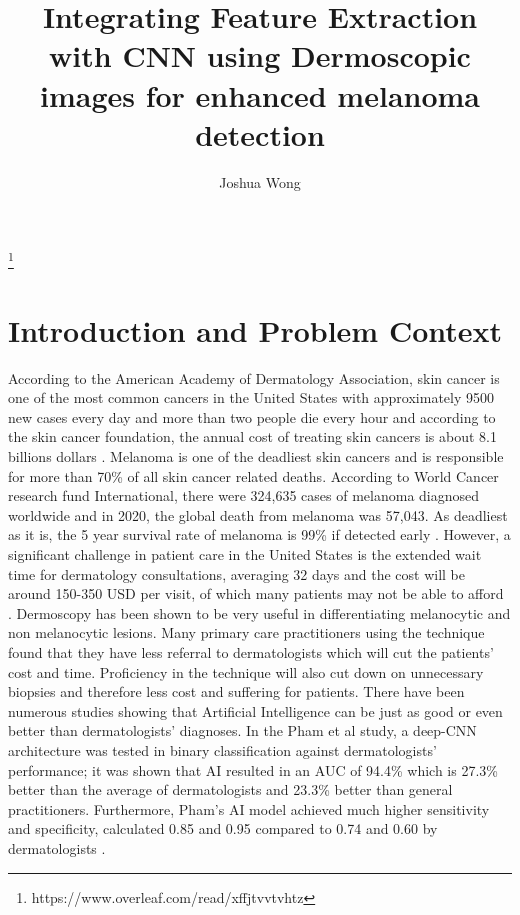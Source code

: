 \documentclass[10pt,twocolumn]{article}
\title{Integrating Feature Extraction with CNN using Dermoscopic images for enhanced melanoma detection
}
\author{Joshua Wong}
\affiliation{Occidental College}
\begin{document}
\maketitle
\footnote{https://www.overleaf.com/read/xffjtvvtvhtz}

\section{Introduction and Problem Context}

According to the American Academy of Dermatology Association, skin cancer is one of the most common cancers in the United States with approximately 9500 new cases every day and more than two people die every hour and according to the skin cancer foundation, the annual cost of treating skin cancers is about 8.1 billions dollars \cite{AmericanAcademy}.
\newline
\newline
Melanoma is one of the deadliest skin cancers and is responsible for more than 70\% of all skin cancer related deaths. According to World Cancer research fund International, there were 324,635 cases of melanoma diagnosed worldwide and in 2020, the global death from melanoma was 57,043. As deadliest as it is, the 5 year survival rate of melanoma is 99\% if detected early \cite{MelanomaIntro}. However, a significant challenge in patient care in the United States is the extended wait time for dermatology consultations, averaging 32 days \cite{Alexander} and the cost will be around 150-350 USD per visit, of which many patients may not be able to afford \cite{MiiSkin_2023}.
\newline
\newline
Dermoscopy has been shown to be very useful in differentiating melanocytic and non melanocytic lesions. Many primary care practitioners using the technique found that they have less referral to dermatologists which will cut the patients’ cost and time. Proficiency in the technique will also cut down on unnecessary biopsies and therefore less cost and suffering for patients. 
\newline
\newline
There have been numerous studies showing that Artificial Intelligence can be just as good or even better than dermatologists’ diagnoses. In the Pham et al study, a deep-CNN architecture was tested in binary classification against dermatologists’ performance; it was shown that AI resulted in an AUC of 94.4\% which is 27.3\% better than the average of dermatologists and 23.3\% better than general practitioners. Furthermore, Pham’s AI model achieved much higher sensitivity and specificity, calculated 0.85 and 0.95 compared to 0.74 and 0.60 by dermatologists \cite{pham2021ai}.
\end{document}
